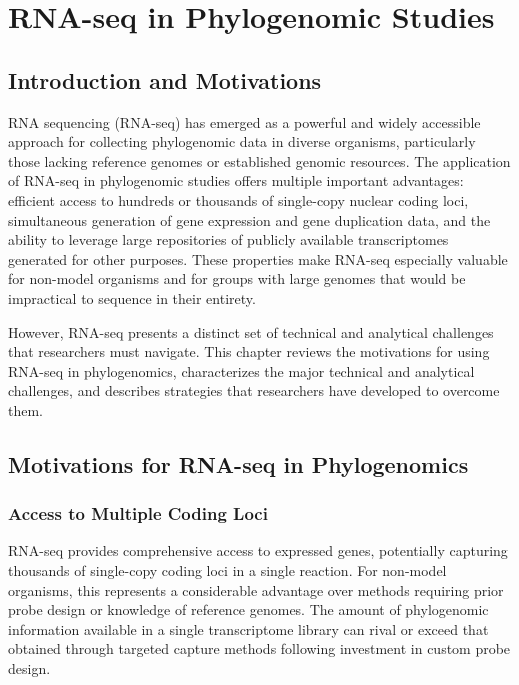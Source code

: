 \chapter{RNA-seq in Phylogenomic Studies}

\section{Introduction and Motivations}

RNA sequencing (RNA-seq) has emerged as a powerful and widely accessible approach for collecting phylogenomic data in diverse organisms, particularly those lacking reference genomes or established genomic resources. The application of RNA-seq in phylogenomic studies offers multiple important advantages: efficient access to hundreds or thousands of single-copy nuclear coding loci, simultaneous generation of gene expression and gene duplication data, and the ability to leverage large repositories of publicly available transcriptomes generated for other purposes. These properties make RNA-seq especially valuable for non-model organisms and for groups with large genomes that would be impractical to sequence in their entirety.

However, RNA-seq presents a distinct set of technical and analytical challenges that researchers must navigate. This chapter reviews the motivations for using RNA-seq in phylogenomics, characterizes the major technical and analytical challenges, and describes strategies that researchers have developed to overcome them.

\section{Motivations for RNA-seq in Phylogenomics}

\subsection{Access to Multiple Coding Loci}

RNA-seq provides comprehensive access to expressed genes, potentially capturing thousands of single-copy coding loci in a single reaction. For non-model organisms, this represents a considerable advantage over methods requiring prior probe design or knowledge of reference genomes. The amount of phylogenomic information available in a single transcriptome library can rival or exceed that obtained through targeted capture methods following investment in custom probe design.

